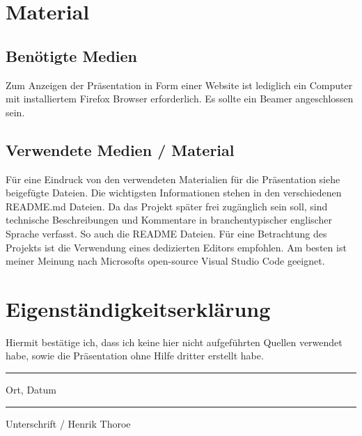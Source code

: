 \documentclass[a4paper, 12pt, oneside]{article}
\begin{document}
    \section{Material}

    \subsection{Benötigte Medien}

    Zum Anzeigen der Präsentation in Form einer Website ist lediglich ein Computer mit 
    installiertem Firefox Browser erforderlich. Es sollte ein Beamer angeschlossen sein.

    \subsection{Verwendete Medien / Material}

    Für eine Eindruck von den verwendeten Materialien für die Präsentation siehe 
    beigefügte Dateien. Die wichtigsten Informationen stehen in den verschiedenen README.md Dateien.
    Da das Projekt später frei zugänglich sein soll, sind technische Beschreibungen und Kommentare 
    in branchentypischer englischer Sprache verfasst. So auch die README Dateien.
    Für eine Betrachtung des Projekts ist die Verwendung eines dedizierten Editors empfohlen.
    Am besten ist meiner Meinung nach Microsofts open-source Visual Studio Code geeignet.


    \cleardoublepage
    \section{Eigenständigkeitserklärung}

    Hiermit bestätige ich, dass ich keine hier nicht aufgeführten Quellen verwendet habe, sowie 
    die Präsentation ohne Hilfe dritter erstellt habe. 

    \vspace{6cm}

    \parbox{6cm}{
        \hrule
        \strut 
        \centering
        \footnotesize Ort, Datum
    } 
    \hfill
    \parbox{6cm}{
        \hrule
        \strut 
        \centering
        \footnotesize Unterschrift / Henrik Thoroe
    }
\end{document}
